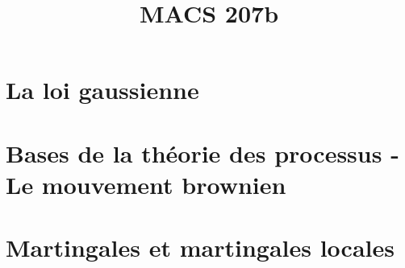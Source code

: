 \documentclass[a4paper,10pt]{article}
\title{\vspace{-1.2cm} \textbf{MACS 207b}}
\begin{document}
\maketitle

\vspace{-1.5cm}

\section{La loi gaussienne}
	

\section{Bases de la théorie des processus - Le mouvement brownien}
	

\section{Martingales et martingales locales}
	
\end{document}
